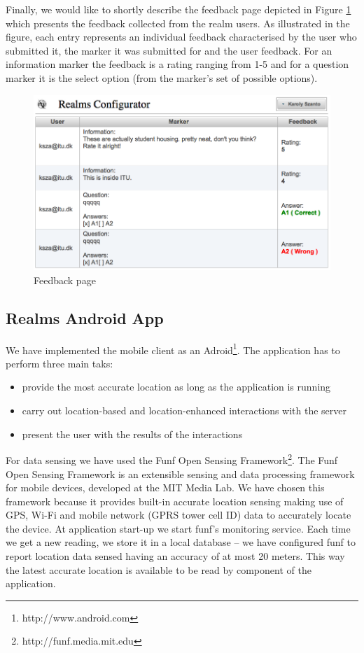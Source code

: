 \noindent Finally, we would like to shortly describe the feedback page depicted in Figure \ref{fig.feedback} which presents the feedback collected from the realm users. As illustrated in the figure, each entry represents an individual feedback characterised by the user who submitted it, the marker it was submitted for and the user feedback. For an information marker the feedback is a rating ranging from 1-5 and for a question marker it is the select option (from the marker's set of possible options).
\begin{figure}[H] 
	\centering
	\includegraphics[width=\linewidth]{fig/feedback.png}
	\caption{Feedback page}
	\label{fig.feedback}
\end{figure}


\subsection{Realms Android App}
\noindent We have implemented the mobile client as an Adroid\footnote{http://www.android.com}. The application has to perform three main taks:
\begin{itemize}
	\item provide the most accurate location as long as the application is running
	\item carry out location-based and location-enhanced interactions with the server
	\item present the user with the results of the interactions
\end{itemize}

\noindent For data sensing we have used the Funf Open Sensing Framework\footnote{http://funf.media.mit.edu}. The Funf Open Sensing Framework is an extensible sensing and data processing framework for mobile devices, developed at the MIT Media Lab. We have chosen this framework because it provides built-in accurate location sensing making use of GPS, Wi-Fi and mobile network (GPRS tower cell ID) data to accurately locate the device. At application start-up we start funf's monitoring service. Each time we get a new reading, we store it in a local database -- we have configured funf to report location data sensed having an accuracy of at most 20 meters. This way the latest accurate location is available to be read by component of the application.
\\

